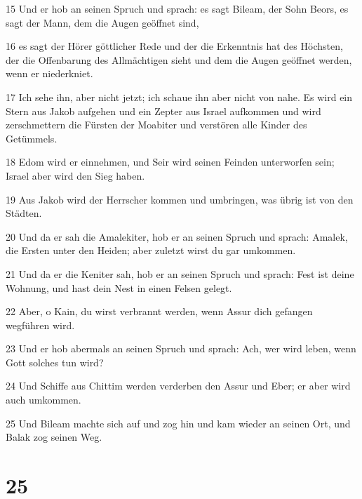\par 15 Und er hob an seinen Spruch und sprach: es sagt Bileam, der Sohn Beors, es sagt der Mann, dem die Augen geöffnet sind,
\par 16 es sagt der Hörer göttlicher Rede und der die Erkenntnis hat des Höchsten, der die Offenbarung des Allmächtigen sieht und dem die Augen geöffnet werden, wenn er niederkniet.
\par 17 Ich sehe ihn, aber nicht jetzt; ich schaue ihn aber nicht von nahe. Es wird ein Stern aus Jakob aufgehen und ein Zepter aus Israel aufkommen und wird zerschmettern die Fürsten der Moabiter und verstören alle Kinder des Getümmels.
\par 18 Edom wird er einnehmen, und Seir wird seinen Feinden unterworfen sein; Israel aber wird den Sieg haben.
\par 19 Aus Jakob wird der Herrscher kommen und umbringen, was übrig ist von den Städten.
\par 20 Und da er sah die Amalekiter, hob er an seinen Spruch und sprach: Amalek, die Ersten unter den Heiden; aber zuletzt wirst du gar umkommen.
\par 21 Und da er die Keniter sah, hob er an seinen Spruch und sprach: Fest ist deine Wohnung, und hast dein Nest in einen Felsen gelegt.
\par 22 Aber, o Kain, du wirst verbrannt werden, wenn Assur dich gefangen wegführen wird.
\par 23 Und er hob abermals an seinen Spruch und sprach: Ach, wer wird leben, wenn Gott solches tun wird?
\par 24 Und Schiffe aus Chittim werden verderben den Assur und Eber; er aber wird auch umkommen.
\par 25 Und Bileam machte sich auf und zog hin und kam wieder an seinen Ort, und Balak zog seinen Weg.

\chapter{25}

